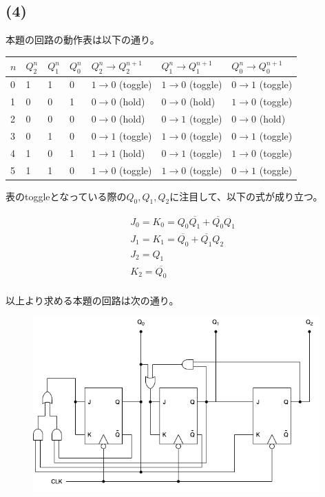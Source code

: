 \documentclass[a4paper,12pt,xelatex,ja=standard]{bxjsarticle}
\begin{document}
\subsection*{(4)}
本題の回路の動作表は以下の通り。
\begin{table}[H]
  \begin{tabular}{|l|l|l|l|l|l|l|}
  \hline
  $n$ & $Q^n_2$ & $Q^n_1$ & $Q^n_0$ & $Q^n_2 \to Q^{n+1}_2$ & $Q^n_1 \to Q^{n+1}_1$ & $Q^n_0 \to Q^{n+1}_0$ \\ \hline \hline
  0 & 1 & 1 & 0 & $1 \to 0$ (toggle) & $1 \to 0$ (toggle) & $0 \to 1$ (toggle) \\ \hline
  1 & 0 & 0 & 1 & $0 \to 0$ (hold)   & $0 \to 0$ (hold)   & $1 \to 0$ (toggle) \\ \hline
  2 & 0 & 0 & 0 & $0 \to 0$ (hold)   & $0 \to 1$ (toggle) & $0 \to 0$ (hold)   \\ \hline
  3 & 0 & 1 & 0 & $0 \to 1$ (toggle) & $1 \to 0$ (toggle) & $0 \to 1$ (toggle) \\ \hline
  4 & 1 & 0 & 1 & $1 \to 1$ (hold)   & $0 \to 1$ (toggle) & $1 \to 0$ (toggle) \\ \hline
  5 & 1 & 1 & 0 & $1 \to 0$ (toggle) & $1 \to 0$ (toggle) & $0 \to 1$ (toggle) \\ \hline
  \end{tabular}
\end{table}

表のtoggleとなっている際の$Q_0, Q_1, Q_2$に注目して、以下の式が成り立つ。

\begin{equation*}
  \begin{split}
    &J_0 = K_0 = Q_0 \overline{Q_1} + \overline{Q_0} Q_1 \\
    &J_1 = K_1 = \overline{Q_0} + \overline{Q_1} Q_2 \\
    &J_2 = Q_1 \\
    &K_2 = \overline{Q_0} \\
  \end{split}
\end{equation*}

以上より求める本題の回路は次の通り。

\begin{figure}[H]
  \centering
  \includegraphics[width=11cm]{images/2013_counter.png}
\end{figure}
\end{document}
